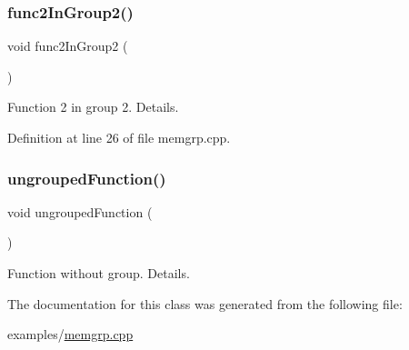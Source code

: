 \subsubsection{\texorpdfstring{func2\+In\+Group2()}{func2InGroup2()}}
{\footnotesize\ttfamily void func2\+In\+Group2 (\begin{DoxyParamCaption}{ }\end{DoxyParamCaption})\hspace{0.3cm}{\ttfamily [protected]}}

Function 2 in group 2. Details. 

Definition at line 26 of file memgrp.\+cpp.

\mbox{\label{class_memgrp___test_aacc99537766f0636d0b7859f710435c7}} 
\subsubsection{\texorpdfstring{ungrouped\+Function()}{ungroupedFunction()}}
{\footnotesize\ttfamily void ungrouped\+Function (\begin{DoxyParamCaption}{ }\end{DoxyParamCaption})}

Function without group. Details. 

The documentation for this class was generated from the following file\+:\begin{DoxyCompactItemize}
\item 
examples/\hyperlink{memgrp_8cpp}{memgrp.\+cpp}\end{DoxyCompactItemize}
